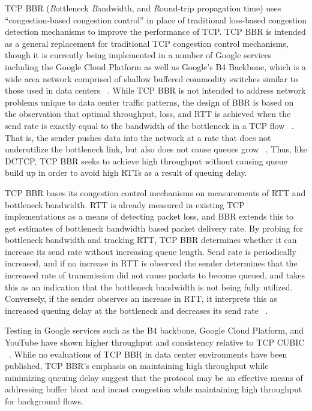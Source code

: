 TCP BBR (\emph{B}ottleneck \emph{B}andwidth, and \emph{R}ound-trip propagation time) uses ``congestion-based congestion control'' in place of traditional loss-based congestion detection mechanisms to improve the performance of TCP. TCP BBR is intended as a general replacement for traditional TCP congestion control mechanisms, though it is currently being implemented in a number of Google services including the Google Cloud Platform as well as Google's B4 Backbone, which is a wide area network comprised of shallow buffered commodity switches similar to those used in data centers ~\cite{cardwell_bbr:_2016, cardwell_tcp_2017}. While TCP BBR is not intended to address network problems unique to data center traffic patterns, the design of BBR is based on the observation that optimal throughput, loss, and RTT is achieved when the send rate is exactly equal to the bandwidth of the bottleneck in a TCP flow ~\cite{kleinrock_power_1979}. That is, the sender pushes data into the network at a rate that does not underutilize the bottleneck link, but also does not cause queues grow ~\cite{cardwell_bbr:_2016}. Thus, like DCTCP, TCP BBR seeks to achieve high throughput without causing queue build up in order to avoid high RTTs as a result of queuing delay.

TCP BBR bases its congestion control mechanisms on measurements of RTT and bottleneck bandwidth. RTT is already measured in existing TCP implementations as a means of detecting packet loss, and BBR extends this to get estimates of bottleneck bandwidth based packet delivery rate. By probing for bottleneck bandwidth and tracking RTT, TCP BBR determines whether it can increase its send rate without increasing queue length. Send rate is periodically increased, and if no increase in RTT is observed the sender determines that the increased rate of transmission did not cause packets to become queued, and takes this as an indication that the bottleneck bandwidth is not being fully utilized. Conversely, if the sender observes an increase in RTT, it interprets this as increased queuing delay at the bottleneck and decreases its send rate ~\cite{cardwell_bbr:_2016}. 

Testing in Google services such as the B4 backbone, Google Cloud Platform, and YouTube have shown higher throughput and consistency relative to TCP CUBIC ~\cite{cardwell_bbr:_2016, cardwell_tcp_2017}. While no evaluations of TCP BBR in data center environments have been published, TCP BBR's emphasis on maintaining high throughput while minimizing queuing delay suggest that the protocol may be an effective means of addressing buffer bloat and incast congestion while maintaining high throughput for background flows.

